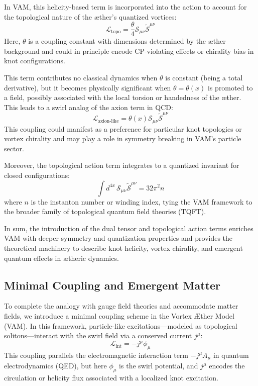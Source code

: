 \documentclass[a4paper,12pt]{article}
\begin{document}
        In VAM, this helicity-based term is incorporated into the action to account for the topological nature of the æther's quantized vortices:
        \begin{equation}
            \mathcal{L}_{\text{topo}} = \frac{\theta}{4} \mathcal{S}_{\mu\nu} \tilde{\mathcal{S}}^{\mu\nu}
        \end{equation}
        Here, $\theta$ is a coupling constant with dimensions determined by the æther background and could in principle encode CP-violating effects or chirality bias in knot configurations.

        This term contributes no classical dynamics when $\theta$ is constant (being a total derivative), but it becomes physically significant when $\theta = \theta(x)$ is promoted to a field, possibly associated with the local torsion or handedness of the æther. This leads to a swirl analog of the axion term in QCD:
        \begin{equation}
            \mathcal{L}_{\text{axion-like}} = \theta(x) \mathcal{S}_{\mu\nu} \tilde{\mathcal{S}}^{\mu\nu}
        \end{equation}
        This coupling could manifest as a preference for particular knot topologies or vortex chirality and may play a role in symmetry breaking in VAM's particle sector.

        Moreover, the topological action term integrates to a quantized invariant for closed configurations:
        \begin{equation}
            \int d^{4x} \, \mathcal{S}_{\mu\nu} \tilde{\mathcal{S}}^{\mu\nu} = 32 \pi^2 n
        \end{equation}
        where $n$ is the instanton number or winding index, tying the VAM framework to the broader family of topological quantum field theories (TQFT).

        In sum, the introduction of the dual tensor and topological action terms enriches VAM with deeper symmetry and quantization properties and provides the theoretical machinery to describe knot helicity, vortex chirality, and emergent quantum effects in ætheric dynamics.

        \subsection{Minimal Coupling and Emergent Matter}
        To complete the analogy with gauge field theories and accommodate matter fields, we introduce a minimal coupling scheme in the Vortex Æther Model (VAM). In this framework, particle-like excitations---modeled as topological solitons---interact with the swirl field via a conserved current $j^\mu$:
        \begin{equation}
            \mathcal{L}_{\text{int}} = -j^\mu \phi_\mu
        \end{equation}
        This coupling parallels the electromagnetic interaction term $-j^\mu A_\mu$ in quantum electrodynamics (QED), but here $\phi_\mu$ is the swirl potential, and $j^\mu$ encodes the circulation or helicity flux associated with a localized knot excitation.
\end{document}

